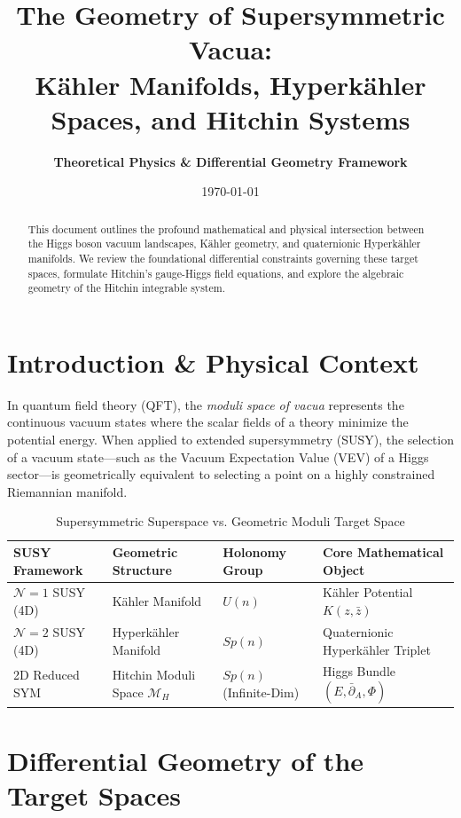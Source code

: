 \documentclass[11pt,a4paper]{article}
\title{\textbf{The Geometry of Supersymmetric Vacua:\\
K\"ahler Manifolds, Hyperk\"ahler Spaces, and Hitchin Systems}}
\author{\textbf{Theoretical Physics \& Differential Geometry Framework}}
\date{\today}
\newcommand{\Mcal}{\mathcal{M}}
\newcommand{\pbar}{\bar{\partial}}
\begin{document}
\maketitle

\begin{abstract}
This document outlines the profound mathematical and physical intersection between the Higgs boson vacuum landscapes, K\"ahler geometry, and quaternionic Hyperk\"ahler manifolds. We review the foundational differential constraints governing these target spaces, formulate Hitchin's gauge-Higgs field equations, and explore the algebraic geometry of the Hitchin integrable system.
\end{abstract}

\section{Introduction \& Physical Context}
In quantum field theory (QFT), the \textit{moduli space of vacua} represents the continuous vacuum states where the scalar fields of a theory minimize the potential energy. When applied to extended supersymmetry (SUSY), the selection of a vacuum state—such as the Vacuum Expectation Value (VEV) of a Higgs sector—is geometrically equivalent to selecting a point on a highly constrained Riemannian manifold. 

\begin{table}[h]
\centering
\caption{Supersymmetric Superspace vs. Geometric Moduli Target Space}
\label{tab:susy_geom}
\smallskip
\begin{tabular}{llll}
\toprule
\textbf{SUSY Framework} & \textbf{Geometric Structure} & \textbf{Holonomy Group} & \textbf{Core Mathematical Object} \\
\midrule
$\mathcal{N}=1$ SUSY (4D) & K\"ahler Manifold & $U(n)$ & K\"ahler Potential $K(z, \bar{z})$ \\
$\mathcal{N}=2$ SUSY (4D) & Hyperk\"ahler Manifold & $Sp(n)$ & Quaternionic Hyperk\"ahler Triplet \\
2D Reduced SYM & Hitchin Moduli Space $\Mcal_H$ & $Sp(n)$ (Infinite-Dim) & Higgs Bundle $(E, \pbar_A, \Phi)$ \\
\bottomrule
\end{tabular}
\end{table}

\section{Differential Geometry of the Target Spaces}
\end{document}
